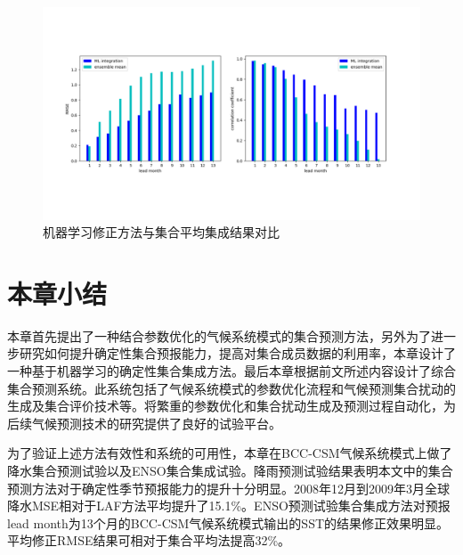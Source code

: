  \begin{figure}[H] %
\label{prectresult}
  \centering
  \includegraphics[scale=0.53,trim=55 90 0 100,clip]{figures/RMSEandcorr-ensega.pdf}
  \caption{机器学习修正方法与集合平均集成结果对比}
  \label{fig:ml integration}
\end{figure}

\section{本章小结}
本章首先提出了一种结合参数优化的气候系统模式的集合预测方法，另外为了进一步研究如何提升确定性集合预报能力，提高对集合成员数据的利用率，本章设计了一种基于机器学习的确定性集合集成方法。最后本章根据前文所述内容设计了综合集合预测系统。此系统包括了气候系统模式的参数优化流程和气候预测集合扰动的生成及集合评价技术等。将繁重的参数优化和集合扰动生成及预测过程自动化，为后续气候预测技术的研究提供了良好的试验平台。

为了验证上述方法有效性和系统的可用性，本章在BCC-CSM气候系统模式上做了降水集合预测试验以及ENSO集合集成试验。降雨预测试验结果表明本文中的集合预测方法对于确定性季节预报能力的提升十分明显。2008年12月到2009年3月全球降水MSE相对于LAF方法平均提升了15.1\%。ENSO预测试验集合集成方法对预报lead month为13个月的BCC-CSM气候系统模式输出的SST的结果修正效果明显。平均修正RMSE结果可相对于集合平均法提高32\%。